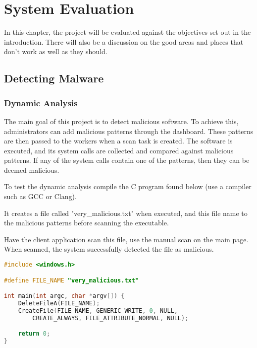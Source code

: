 \chapter{System Evaluation}

In this chapter, the project will be evaluated against the
objectives set out in the introduction.
There will also be a discussion on the good areas and places
that don't work as well as they should.

\section{Detecting Malware}
\subsection{Dynamic Analysis}
The main goal of this project is to detect malicious software.
To achieve this, administrators can add malicious patterns through the dashboard.
These patterns are then passed to the workers when a scan task is created.
The software is executed, and its system calls are collected
and compared against malicious patterns.
If any of the system calls contain one of the patterns,
then they can be deemed malicious.

To test the dynamic analysis compile the C program found below
(use a compiler such as GCC or Clang).

It creates a file called "very\_malicious.txt" when executed,
and this file name to the malicious patterns before scanning the executable.

Have the client application scan this file,
use the manual scan on the main page.
When scanned, the system successfully detected the file as malicious.

\begin{lstlisting}[language=C]
#include <windows.h>

#define FILE_NAME "very_malicious.txt"

int main(int argc, char *argv[]) {
    DeleteFileA(FILE_NAME);
    CreateFile(FILE_NAME, GENERIC_WRITE, 0, NULL,
        CREATE_ALWAYS, FILE_ATTRIBUTE_NORMAL, NULL);

    return 0;
}
\end{lstlisting}


